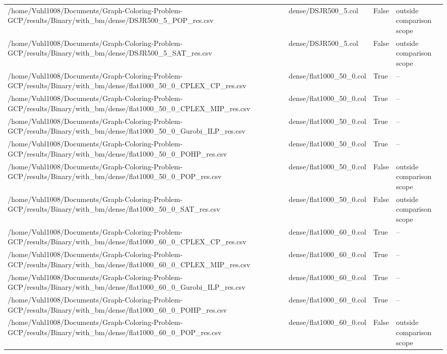 \begin{table}[htbp]
\begin{tabular}{llll}
/home/Vuhl1008/Documents/Graph-Coloring-Problem-GCP/results/Binary/with\_bm/dense/DSJR500\_5\_POP\_res.csv & dense/DSJR500\_5.col & False & outside comparison scope \\
/home/Vuhl1008/Documents/Graph-Coloring-Problem-GCP/results/Binary/with\_bm/dense/DSJR500\_5\_SAT\_res.csv & dense/DSJR500\_5.col & False & outside comparison scope \\
/home/Vuhl1008/Documents/Graph-Coloring-Problem-GCP/results/Binary/with\_bm/dense/flat1000\_50\_0\_CPLEX\_CP\_res.csv & dense/flat1000\_50\_0.col & True & -- \\
/home/Vuhl1008/Documents/Graph-Coloring-Problem-GCP/results/Binary/with\_bm/dense/flat1000\_50\_0\_CPLEX\_MIP\_res.csv & dense/flat1000\_50\_0.col & True & -- \\
/home/Vuhl1008/Documents/Graph-Coloring-Problem-GCP/results/Binary/with\_bm/dense/flat1000\_50\_0\_Gurobi\_ILP\_res.csv & dense/flat1000\_50\_0.col & True & -- \\
/home/Vuhl1008/Documents/Graph-Coloring-Problem-GCP/results/Binary/with\_bm/dense/flat1000\_50\_0\_POHP\_res.csv & dense/flat1000\_50\_0.col & True & -- \\
/home/Vuhl1008/Documents/Graph-Coloring-Problem-GCP/results/Binary/with\_bm/dense/flat1000\_50\_0\_POP\_res.csv & dense/flat1000\_50\_0.col & False & outside comparison scope \\
/home/Vuhl1008/Documents/Graph-Coloring-Problem-GCP/results/Binary/with\_bm/dense/flat1000\_50\_0\_SAT\_res.csv & dense/flat1000\_50\_0.col & False & outside comparison scope \\
/home/Vuhl1008/Documents/Graph-Coloring-Problem-GCP/results/Binary/with\_bm/dense/flat1000\_60\_0\_CPLEX\_CP\_res.csv & dense/flat1000\_60\_0.col & True & -- \\
/home/Vuhl1008/Documents/Graph-Coloring-Problem-GCP/results/Binary/with\_bm/dense/flat1000\_60\_0\_CPLEX\_MIP\_res.csv & dense/flat1000\_60\_0.col & True & -- \\
/home/Vuhl1008/Documents/Graph-Coloring-Problem-GCP/results/Binary/with\_bm/dense/flat1000\_60\_0\_Gurobi\_ILP\_res.csv & dense/flat1000\_60\_0.col & True & -- \\
/home/Vuhl1008/Documents/Graph-Coloring-Problem-GCP/results/Binary/with\_bm/dense/flat1000\_60\_0\_POHP\_res.csv & dense/flat1000\_60\_0.col & True & -- \\
/home/Vuhl1008/Documents/Graph-Coloring-Problem-GCP/results/Binary/with\_bm/dense/flat1000\_60\_0\_POP\_res.csv & dense/flat1000\_60\_0.col & False & outside comparison scope \\

\end{tabular}
\end{table}
